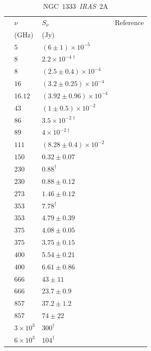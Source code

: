 \documentclass[9pt]{extarticle}   	%
\begin{document}
\begin{table}
\caption{NGC~$1333$~\textit{IRAS}~$2$A}
\begin{center}
\begin{tabular}{llll}
\hline
 & $\nu$ & $S_\nu$ & Reference\\
 & (GHz) & (Jy) & \\
\hline
 & $5$ & $(6\pm1)\times10^{-5}$ & \citet{1999ApJS..125..427R}\\
 & $8$ & $2.2\times10^{-4\dag}$ & \citet{2002AJ....124.1045R}\\
 & $8$ & $(2.5\pm0.4)\times10^{-4}$ & \citet{1999ApJS..125..427R}\\
 & $16$ & $(3.2\pm0.25)\times10^{-4}$ & \citet{2011MNRAS.415..893A}\\
 & $16.12$ & $(3.92\pm0.96)\times10^{-4}$ & \citet{2012MNRAS.423.1089A}\\
 & $43$ & $(1\pm0.5)\times10^{-2}$ & \citet{2004ApJ...605L.137A}\\
 & $86$ & $3.5\times10^{-2\dag}$ & \citet{2004AA...413..993J}\\
 & $89$ & $4\times10^{-2\dag}$ & \citet{2004AA...413..993J}\\
 & $111$ & $(8.28\pm0.4)\times10^{-2}$ & \citet{2000ApJ...529..477L}\\
 & $150$ & $0.32\pm0.07$ & \citet{1994AA...285L...1S}\\
 & $230$ & $0.88^{\dag}$ & \citet{2001AA...365..440M}\\
 & $230$ & $0.88\pm0.12$ & \citet{1994AA...285L...1S}\\
 & $273$ & $1.46\pm0.12$ & \citet{1994AA...285L...1S}\\
 & $353$ & $7.78^{\dag}$ & \citet{2007ApJ...668.1042K}\\
 & $353$ & $4.79\pm0.39$ & \citet{2000ApJ...530..851C}\\
 & $375$ & $4.08\pm0.05$ & \citet{1994AA...285L...1S}\\
 & $375$ & $3.75\pm0.15$ & \citet{1994AA...285L...1S}\\
 & $400$ & $5.54\pm0.21$ & \citet{1994AA...285L...1S}\\
 & $400$ & $6.61\pm0.86$ & \citet{2000ApJ...530..851C}\\
 & $666$ & $43\pm11$ & \citet{2000ApJ...530..851C}\\
 & $666$ & $23.7\pm0.9$ & \citet{1994AA...285L...1S}\\
 & $857$ & $37.2\pm1.2$ & \citet{1994AA...285L...1S}\\
 & $857$ & $74\pm22$ & \citet{2000ApJ...530..851C}\\
 & $3\times10^{3}$ & $300^{\dag}$ & \citet{1987MNRAS.226..461J}\\
 & $6\times10^{3}$ & $104^{\dag}$ & \citet{1987MNRAS.226..461J}\\
\end{tabular}
\end{center}
\label{default}
\end{table}%
\end{document}
